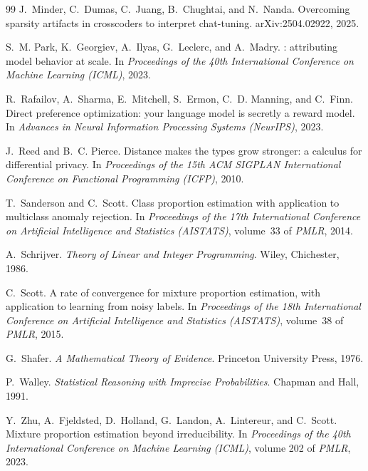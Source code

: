 \documentclass[11pt]{article}
\theoremstyle{definition}
\theoremstyle{remark}
\begin{document}
\begin{thebibliography}{99}
J.~Minder, C.~Dumas, C.~Juang, B.~Chughtai, and N.~Nanda.
\newblock Overcoming sparsity artifacts in crosscoders to interpret chat-tuning.
\newblock arXiv:2504.02922, 2025.

S.~M. Park, K.~Georgiev, A.~Ilyas, G.~Leclerc, and A.~Madry.
: attributing model behavior at scale.
\newblock In \emph{Proceedings of the 40th International Conference on Machine Learning (ICML)}, 2023.

R.~Rafailov, A.~Sharma, E.~Mitchell, S.~Ermon, C.~D. Manning, and C.~Finn.
\newblock Direct preference optimization: your language model is secretly a reward model.
\newblock In \emph{Advances in Neural Information Processing Systems (NeurIPS)}, 2023.

J.~Reed and B.~C. Pierce.
\newblock Distance makes the types grow stronger: a calculus for differential privacy.
\newblock In \emph{Proceedings of the 15th ACM SIGPLAN International Conference on Functional
  Programming (ICFP)}, 2010.

T.~Sanderson and C.~Scott.
\newblock Class proportion estimation with application to multiclass anomaly rejection.
\newblock In \emph{Proceedings of the 17th International Conference on Artificial Intelligence and
  Statistics (AISTATS)}, volume~33 of \emph{PMLR}, 2014.

A.~Schrijver.
\newblock \emph{Theory of Linear and Integer Programming}.
\newblock Wiley, Chichester, 1986.

C.~Scott.
\newblock A rate of convergence for mixture proportion estimation, with application to learning from
  noisy labels.
\newblock In \emph{Proceedings of the 18th International Conference on Artificial Intelligence and
  Statistics (AISTATS)}, volume~38 of \emph{PMLR}, 2015.

G.~Shafer.
\newblock \emph{A Mathematical Theory of Evidence}.
\newblock Princeton University Press, 1976.

P.~Walley.
\newblock \emph{Statistical Reasoning with Imprecise Probabilities}.
\newblock Chapman and Hall, 1991.

Y.~Zhu, A.~Fjeldsted, D.~Holland, G.~Landon, A.~Lintereur, and C.~Scott.
\newblock Mixture proportion estimation beyond irreducibility.
\newblock In \emph{Proceedings of the 40th International Conference on Machine Learning (ICML)},
  volume 202 of \emph{PMLR}, 2023.

\end{thebibliography}
\end{document}
